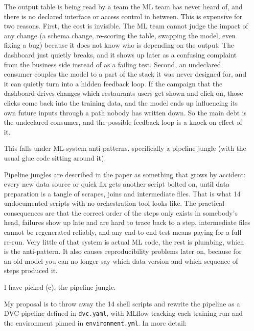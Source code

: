 \documentclass[11pt,a4paper]{article}
\newcommand{\qhead}[1]{\vspace{8pt}{\large\bfseries #1}\par\vspace{-2pt}}
\newcommand{\shead}[1]{\vspace{4pt}{\bfseries #1}\par\vspace{-3pt}}
\begin{document}
The output table is being read by a team the ML team has never heard of, and there is no declared
interface or access control in between. This is expensive for two reasons. First, the cost is
invisible. The ML team cannot judge the impact of any change (a schema change, re-scoring the table,
swapping the model, even fixing a bug) because it does not know who is depending on the output. The
dashboard just quietly breaks, and it shows up later as a confusing complaint from the business side
instead of as a failing test. Second, an undeclared consumer couples the model to a part of the stack
it was never designed for, and it can quietly turn into a hidden feedback loop. If the campaign that
the dashboard drives changes which restaurants users get shown and click on, those clicks come back
into the training data, and the model ends up influencing its own future inputs through a path nobody
has written down. So the main debt is the undeclared consumer, and the possible feedback loop is a
knock-on effect of it.

\shead{(c) Training pipeline made of 14 undocumented shell scripts with no orchestration}

This falls under ML-system anti-patterns, specifically a pipeline jungle (with the usual glue code
sitting around it).

Pipeline jungles are described in the paper as something that grows by accident: every new data source
or quick fix gets another script bolted on, until data preparation is a tangle of scrapes, joins and
intermediate files. That is what 14 undocumented scripts with no orchestration tool looks like. The
practical consequences are that the correct order of the steps only exists in somebody's head, failures
show up late and are hard to trace back to a step, intermediate files cannot be regenerated reliably,
and any end-to-end test means paying for a full re-run. Very little of that system is actual ML code,
the rest is plumbing, which is the anti-pattern. It also causes reproducibility problems later on,
because for an old model you can no longer say which data version and which sequence of steps produced
it.

\qhead{Part 2: A mitigation for one of them}

I have picked (c), the pipeline jungle.

My proposal is to throw away the 14 shell scripts and rewrite the pipeline as a DVC pipeline defined in
\texttt{dvc.yaml}, with MLflow tracking each training run and the environment pinned in
\texttt{environment.yml}. In more detail:
\end{document}
